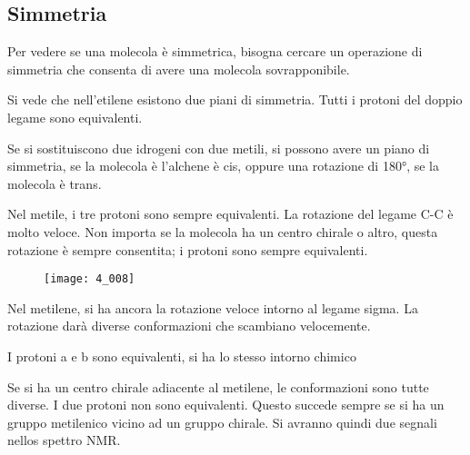 \subsection{Simmetria}

Per vedere se una molecola è simmetrica, bisogna cercare un operazione di simmetria che consenta di avere una molecola sovrapponibile.


Si vede che nell'etilene esistono due piani di simmetria. Tutti i protoni del doppio legame sono equivalenti.

Se si sostituiscono due idrogeni con due metili, si possono avere un piano di simmetria, se la molecola è l'alchene è cis, oppure una rotazione di 180°, se la molecola è trans.


Nel metile, i tre protoni sono sempre equivalenti. La
rotazione del legame C-C è molto veloce. Non importa se la molecola ha
un centro chirale o altro, questa rotazione è sempre consentita; i
protoni sono sempre equivalenti.

\begin{figure}[H]
  \texttt{[image: 4\_008]}
\end{figure}

Nel metilene, si ha ancora la rotazione veloce intorno al legame sigma. La rotazione
darà diverse conformazioni che scambiano velocemente.


I protoni a e b sono equivalenti, si ha lo stesso intorno chimico 


Se si ha un centro chirale adiacente al metilene, le conformazioni sono
tutte diverse. I due protoni non sono equivalenti.
Questo succede sempre se si ha un gruppo metilenico vicino ad un gruppo
chirale. Si avranno quindi due segnali nellos spettro NMR.


